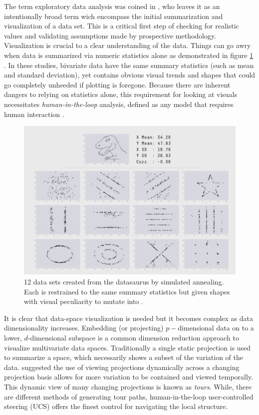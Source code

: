 \documentclass{monashthesis}
\begin{document}
The term exploratory data analysis was coined in \textcite{tukey_exploratory_1977}, who leaves it as an intentionally broad term wich encompass the initial summarization and visualization of a data set. This is a critical first step of checking for realistic values and validating assumptions made by prospective methodology. Visualization is crucial to a clear understanding of the data. Things can go awry when data is summarized via numeric statistics alone \autocite{anscombe_graphs_1973} as demonstrated in figure \ref{fig:matejka17fig} \autocite{matejka_same_2017}. In these studies, bivariate data have the same summary statistics (such as mean and standard deviation), yet contains obvious visual trends and shapes that could go completely unheeded if plotting is foregone. Because there are inherent dangers to relying on statistics alone, this requirement for looking at visuals necessitates \emph{human-in-the-loop} analysis, defined as any model that requires human interaction \autocite{karwowski_international_2006}.



\begin{figure}

{\centering \includegraphics[width=0.7\linewidth]{./figures/matejka17fig} 

}

\caption{12 data sets created from the datasaurus by simulated annealing. Each is restrained to the same summary statistics but given shapes with visual peculiarity to mutate into \autocite{matejka_same_2017}.}\label{fig:matejka17fig}
\end{figure}

It is clear that data-space visualization is needed but it becomes complex as data dimensionality increases. Embedding (or projecting) \(p-\)dimensional data on to a lower, \(d\)-dimensional subspace is a common dimension reduction approach to visualize multivariate data spaces. Traditionally a single static projection is used to summarize a space, which necessarily shows a subset of the variation of the data. \textcite{asimov_grand_1985} suggested the use of viewing projections dynamically across a changing projection basis allows for more variation to be contained and viewed temporally. This dynamic view of many changing projections is known as \emph{tours}. While, there are different methods of generating tour paths, human-in-the-loop user-controlled steering (UCS) offers the finest control for navigating the local structure.
\end{document}
